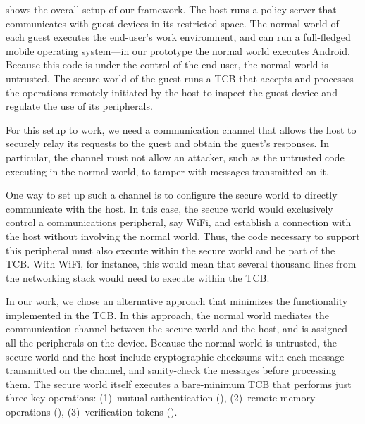  shows the overall setup of our framework. The host
runs a policy server that communicates with guest devices in its restricted
space. The normal world of each guest executes the end-user's work environment,
and can run a full-fledged mobile operating system---in our prototype the
normal world executes Android. Because this code is under the control of the
end-user, the normal world is untrusted. The secure world of the guest runs a
TCB that accepts and processes the operations remotely-initiated by the host to
inspect the guest device and regulate the use of its peripherals. 

For this setup to work, we need a communication channel that allows the host to
securely relay its requests to the guest and obtain the guest's responses. In
particular, the channel must not allow an attacker, such as the untrusted code
executing in the normal world, to tamper with messages transmitted on it.

One way to set up such a channel is to configure the secure world to directly
communicate with the host. In this case, the secure world would exclusively
control a communications peripheral, say WiFi, and establish a connection with
the host without involving the normal world. Thus, the code necessary to
support this peripheral must also execute within the secure world and be part
of the TCB. With WiFi, for instance, this would mean that several thousand
lines from the networking stack would need to execute within the TCB.

In our work, we chose an alternative approach that minimizes the functionality
implemented in the TCB. In this approach, the normal world mediates the
communication channel between the secure world and the host, and is assigned
all the peripherals on the device. Because the normal world is untrusted, the
secure world and the host include cryptographic checksums with each message
transmitted on the channel, and sanity-check the messages before processing
them. The secure world itself executes a bare-minimum TCB that performs just
three key operations:
%
(1)~mutual authentication (), 
%
(2)~remote memory operations (),
%
(3)~verification tokens (). 

